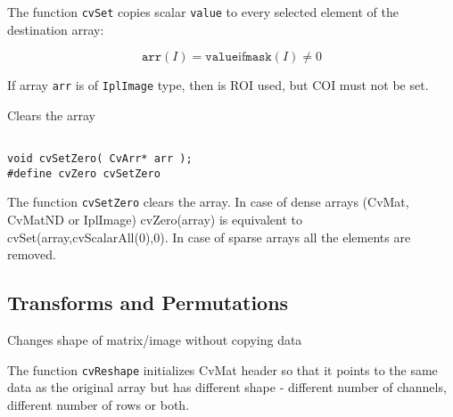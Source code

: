 The function \texttt{cvSet} copies scalar \texttt{value} to every selected element of the destination array:

\[
\texttt{arr}(I)=\texttt{value} \text{if} \texttt{mask}(I) \ne 0
\]

If array \texttt{arr} is of \texttt{IplImage} type, then is ROI used, but COI must not be set.


Clears the array

\begin{lstlisting}

void cvSetZero( CvArr* arr );
#define cvZero cvSetZero

\end{lstlisting}

\begin{description}
\end{description}

The function \texttt{cvSetZero} clears the array. In case of dense arrays (CvMat, CvMatND or IplImage) cvZero(array) is equivalent to
cvSet(array,cvScalarAll(0),0).
In case of sparse arrays all the elements are removed.

\subsection{Transforms and Permutations}


Changes shape of matrix/image without copying data


\begin{description}
\end{description}

The function \texttt{cvReshape} initializes CvMat header so that it points to the same data as the original array but has different shape - different number of channels, different number of rows or both.


